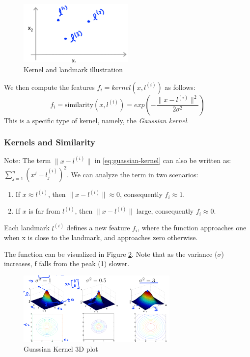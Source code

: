     \begin{figure}[htbp]
        \centering
        \includegraphics[width=0.5\textwidth]{image/landmark.png}
        \caption{Kernel and landmark illustration}
        \label{fig:landmark}
    \end{figure}

    We then compute the features $f_i = kernel(x, l^{(i)})$ as follows: 
    \begin{equation}
        f_i = \text{similarity}(x, l^{(i)}) = exp ( - \frac{\| x-l^{(i)}\|^2}{2\sigma^2})
        \label{eq:guassian-kernel}
    \end{equation}
    This is a specific type of kernel, namely, the \emph{Gaussian kernel}.

    \subsubsection{Kernels and Similarity} 
    Note: The term $\| x-l^{(i)} \|$ in \ref{eq:guassian-kernel} can also be written as: $\sum_{j=1}^{n} (x^j - l^{(i)}_j)^2$. We can analyze the term in two scenarios:
    \begin{enumerate}
        \item If $x\approx l^{(i)}$, then $\| x-l^{(i)} \|\approx 0$, consequently $f_i \approx 1$.
        \item If $x$ is far from $l^{(i)}$, then $\| x-l^{(i)} \|$ large, consequently $f_i \approx 0$.
    \end{enumerate}

    Each landmark $l^{(i)}$ defines a new feature $f_i$, where the function approaches one when x is close to the landmark, and approaches zero otherwise.

    The function can be visualized in Figure \ref{fig:guassian-kernel-plot}. Note that as the variance ($\sigma$) increases, f falls from the peak (1) slower.
   \begin{figure}[htpb]
       \centering
       \includegraphics[width=0.7\textwidth]{image/guassian-kernel-plot.png}
       \caption{Guassian Kernel 3D plot}
       \label{fig:guassian-kernel-plot}
   \end{figure} 

